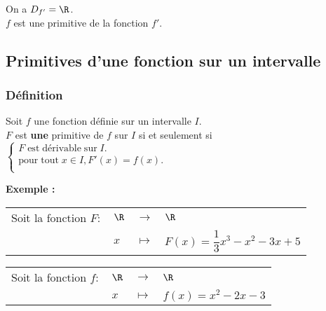 \vspace*{.3cm}

On a $D_{f'} = \R$. \\

$f$ est une primitive de la fonction $f'$. 

\newpage

\vspace*{-2.2cm}

\subsection{Primitives d'une fonction sur un intervalle}

\subsubsection{Définition}

Soit $f$ une fonction définie sur un intervalle $I$. \\
$F$ est \textbf{une} primitive de $f$ sur $I$ si et seulement si $\left\{
  \begin{array}{l}
   F \mathrm{ \; est \; dérivable \; sur \; } I.\\
    \mathrm{pour \; tout \; } x \in I, F'(x) = f(x). \\
  \end{array}
\right.$

\vspace*{.3cm}

\textbf{Exemple :} \\

\begin{tabular}{llll}
\hspace*{-.3cm} Soit la fonction $F:$ & $\R$ & $\longrightarrow$ & $\R$ \\
& $x$ & $\longmapsto$ & $F(x) = \dfrac{1}{3}x^3 - x^2 - 3x + 5$ \\
\end{tabular}

\vspace*{.3cm}

\begin{tabular}{llll}
\hspace*{-.3cm} Soit la fonction $f:$ & $\R$ & $\longrightarrow$ & $\R$ \\
& $x$ & $\longmapsto$ & $f(x) = x^2 - 2x - 3$\\
\end{tabular}

\vspace*{.3cm}


